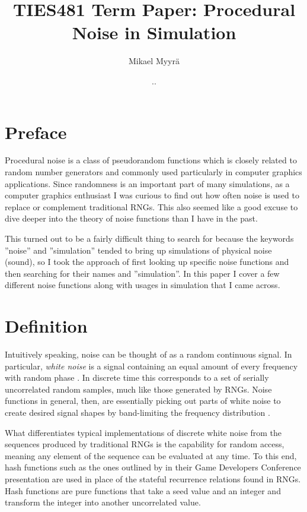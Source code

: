 \documentclass{article}
\title{TIES481 Term Paper: Procedural Noise in Simulation}
\author{Mikael Myyrä}
\date{\number\day.\number\month.\number\year}
\begin{document}
\maketitle

\section*{Preface}

Procedural noise is a class of pseudorandom functions which is closely related
to random number generators and commonly used particularly in computer graphics
applications. Since randomness is an important part of many simulations, as a
computer graphics enthusiast I was curious to find out how often noise is used
to replace or complement traditional RNGs. This also seemed like a good excuse
to dive deeper into the theory of noise functions than I have in the past.

This turned out to be a fairly difficult thing to search for because the
keywords ''noise'' and ''simulation'' tended to bring up simulations of
physical noise (sound), so I took the approach of first looking up specific
noise functions and then searching for their names and ''simulation''.
In this paper I cover a few different noise functions along with
usages in simulation that I came across.

\section*{Definition}

Intuitively speaking, noise can be thought of as a random continuous signal.
In particular, \textit{white noise} is a signal containing an equal amount of
every frequency with random phase \parencite{lagae_survey_2010}. In discrete
time this corresponds to a set of serially uncorrelated random samples, much
like those generated by RNGs. Noise functions in general, then, are essentially
picking out parts of white noise to create desired signal shapes by
band-limiting the frequency distribution \parencite{lagae_survey_2010}.

What differentiates typical implementations of discrete white noise from the
sequences produced by traditional RNGs is the capability for random access,
meaning any element of the sequence can be evaluated at any time. To this end,
hash functions such as the ones outlined by
\citeauthor{eiserloh_noise-based_2017} in their Game Developers Conference
presentation \parencite*{eiserloh_noise-based_2017} are used in place of the
stateful recurrence relations found in RNGs. Hash functions are pure functions
that take a seed value and an integer and transform the integer into another
uncorrelated value.
\end{document}
